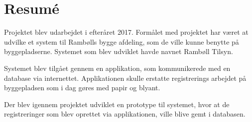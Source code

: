 \chapter*{Resumé}
Projektet blev udarbejdet i efteråret 2017. Formålet med projektet har været at udvilke et system til Rambølls bygge afdeling, som de ville kunne benytte på byggepladserne. Systemet som blev udviklet havde navnet Rambøll Tilsyn.

Systemet blev tilgået gennem en applikation, som kommunikerede med en database via internettet.
Applikationen skulle erstatte registrerings arbejdet på byggepladsen som i dag gøres med papir og blyant.

Der blev igennem projektet udviklet en prototype til systemet, hvor at de registreringer som blev oprettet via applikationen, ville blive gemt i databasen.  \\
\newline
\newline
\newline
\newline